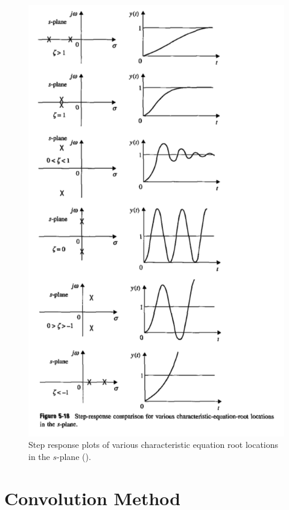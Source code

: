 \documentclass[10pt,letterpaper]{article}
\begin{document}
\begin{figure}
	\centering
	\includegraphics[width=\textwidth, height=0.9\textheight, keepaspectratio]{step-response_comparisons_of_various_root_locations.png}
	\caption{Step response plots of various characteristic equation root locations in the $s$-plane (\citet{kuo10.1}).}
	\label{fig:step-response_comparisons_of_various_root_locations}
\end{figure}

\section{Convolution Method}
\end{document}
